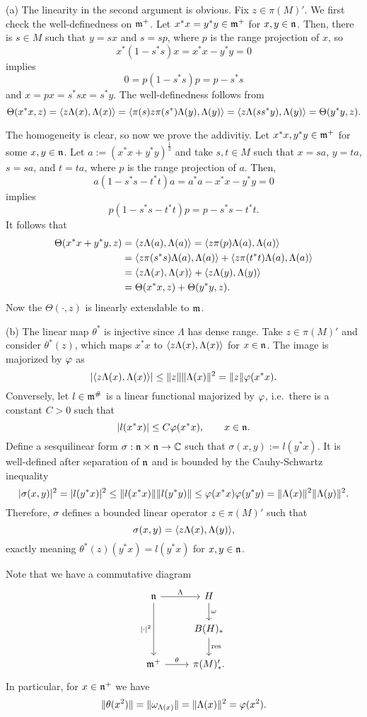 \documentclass{../../small}
\begin{document}
\begin{pf}
(a)
The linearity in the second argument is obvious.
Fix $z\in\pi(M)'$.
We first check the well-definedness on $\mathfrak{m}^+$.
Let $x^*x=y^*y\in\mathfrak{m}^+$ for $x,y\in\mathfrak{n}$.
Then, there is $s\in M$ such that $y=sx$ and $s=sp$, where $p$ is the range projection of $x$, so
\[x^*(1-s^*s)x=x^*x-y^*y=0\]
implies
\[0=p(1-s^*s)p=p-s^*s\]
and $x=px=s^*sx=s^*y$.
The well-definedness follows from
\[\Theta(x^*x,z)=\langle z\Lambda(x),\Lambda(x)\rangle=\langle\pi(s)z\pi(s^*)\Lambda(y),\Lambda(y)\rangle=\langle z\Lambda(ss^*y),\Lambda(y)\rangle=\Theta(y^*y,z).\]

The homogeneity is clear, so now we prove the addivitiy.
Let $x^*x,y^*y\in\mathfrak{m}^+$ for some $x,y\in\mathfrak{n}$.
Let $a:=(x^*x+y^*y)^{\frac12}$ and take $s,t\in M$ such that $x=sa$, $y=ta$, $s=sa$, and $t=ta$, where $p$ is the range projection of $a$.
Then,
\[a(1-s^*s-t^*t)a=a^*a-x^*x-y^*y=0\]
implies
\[p(1-s^*s-t^*t)p=p-s^*s-t^*t.\]
It follows that
\begin{align*}
\Theta(x^*x+y^*y,z)
&=\langle z\Lambda(a),\Lambda(a)\rangle=\langle z\pi(p)\Lambda(a),\Lambda(a)\rangle\\
&=\langle z\pi(s^*s)\Lambda(a),\Lambda(a)\rangle+\langle z\pi(t^*t)\Lambda(a),\Lambda(a)\rangle\\
&=\langle z\Lambda(x),\Lambda(x)\rangle+\langle z\Lambda(y),\Lambda(y)\rangle\\
&=\Theta(x^*x,z)+\Theta(y^*y,z).
\end{align*}
Now the $\Theta(\cdot,z)$ is linearly extendable to $\mathfrak{m}$.

(b)
The linear map $\theta^*$ is injective since $\Lambda$ has dense range.
Take $z\in\pi(M)'$ and consider $\theta^*(z)$, which maps $x^*x$ to $\langle z\Lambda(x),\Lambda(x)\rangle$ for $x\in\mathfrak{n}$.
The image is majorized by $\varphi$ as
\[|\langle z\Lambda(x),\Lambda(x)\rangle|\le\|z\|\|\Lambda(x)\|^2=\|z\|\varphi(x^*x).\]
Conversely, let $l\in\mathfrak{m}^\#$ is a linear functional majorized by $\varphi$, i.e.~there is a constant $C>0$ such that
\[|l(x^*x)|\le C\varphi(x^*x),\qquad x\in\mathfrak{n}.\]
Define a sesquilinear form $\sigma:\mathfrak{n}\times\mathfrak{n}\to\mathbb{C}$ such that $\sigma(x,y):=l(y^*x)$.
It is well-defined after separation of $\mathfrak{n}$ and is bounded by the Cauhy-Schwartz inequality
\[|\sigma(x,y)|^2=|l(y^*x)|^2\le\|l(x^*x)\|\|l(y^*y)\|\le\varphi(x^*x)\varphi(y^*y)=\|\Lambda(x)\|^2\|\Lambda(y)\|^2.\]
Therefore, $\sigma$ defines a bounded linear operator $z\in\pi(M)'$ such that
\[\sigma(x,y)=\langle z\Lambda(x),\Lambda(y)\rangle,\]
exactly meaning $\theta^*(z)(y^*x)=l(y^*x)$ for $x,y\in\mathfrak{n}$.
\end{pf}

Note that we have a commutative diagram
\[\begin{tikzcd}
\fn \ar{r}{\Lambda}\ar[swap]{dd}{|\cdot|^2} & H \ar{d}{\omega} \\
& B(H)_* \ar{d}{\mathrm{res}}\\
\fm^+ \ar{r}{\theta} & \pi(M)'_*.
\end{tikzcd}\]
In particular, for $x\in\mathfrak{n}^+$ we have
\[\|\theta(x^2)\|=\|\omega_{\Lambda(x)}\|=\|\Lambda(x)\|^2=\varphi(x^2).\]
\end{document}

